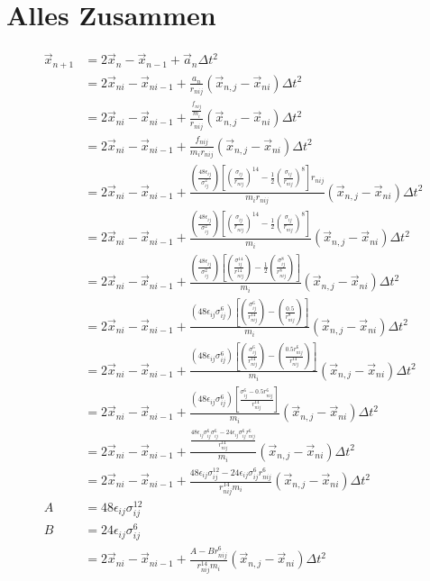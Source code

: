 \documentclass{article}
\begin{document}
\section*{Alles Zusammen}
\begin{align}
	\vec{x}_{n+1}&=2\vec{x}_n-\vec{x}_{n-1}+\vec{a}_n\Delta t^2\\
	&=2\vec{x}_{ni}-\vec{x}_{ni-1}+\frac{a_n}{r_{nij}}\left(\vec{x}_{n,j}-\vec{x}_{ni}\right)\Delta t^2\\
	&=2\vec{x}_{ni}-\vec{x}_{ni-1}+\frac{\frac{f_{nij}}{m_i}}{r_{nij}}\left(\vec{x}_{n,j}-\vec{x}_{ni}\right)\Delta t^2\\
	&=2\vec{x}_{ni}-\vec{x}_{ni-1}+\frac{f_{nij}}{m_ir_{nij}}\left(\vec{x}_{n,j}-\vec{x}_{ni}\right)\Delta t^2\\
	&=2\vec{x}_{ni}-\vec{x}_{ni-1}+\frac{\left(\frac{48\epsilon_{ij}}{\sigma_{ij}^2}\right)\left[\left(\frac{\sigma_{ij}}{r_{nij}}\right)^{14}-\frac{1}{2}\left(\frac{\sigma_{ij}}{r_{nij}}\right)^8\right]r_{nij}}{m_ir_{nij}}\left(\vec{x}_{n,j}-\vec{x}_{ni}\right)\Delta t^2\\
	&=2\vec{x}_{ni}-\vec{x}_{ni-1}+\frac{\left(\frac{48\epsilon_{ij}}{\sigma_{ij}^2}\right)\left[\left(\frac{\sigma_{ij}}{r_{nij}}\right)^{14}-\frac{1}{2}\left(\frac{\sigma_{ij}}{r_{nij}}\right)^8\right]}{m_i}\left(\vec{x}_{n,j}-\vec{x}_{ni}\right)\Delta t^2\\
	&=2\vec{x}_{ni}-\vec{x}_{ni-1}+\frac{\left(\frac{48\epsilon_{ij}}{\sigma_{ij}^2}\right)\left[\left(\frac{\sigma_{ij}^{14}}{r_{nij}^{14}}\right)-\frac{1}{2}\left(\frac{\sigma_{ij}^8}{r_{nij}^8}\right)\right]}{m_i}\left(\vec{x}_{n,j}-\vec{x}_{ni}\right)\Delta t^2\\
	&=2\vec{x}_{ni}-\vec{x}_{ni-1}+\frac{\left(48\epsilon_{ij}\sigma_{ij}^{6}\right)\left[\left(\frac{\sigma_{ij}^{6}}{r_{nij}^{14}}\right)-\left(\frac{0.5}{r_{nij}^8}\right)\right]}{m_i}\left(\vec{x}_{n,j}-\vec{x}_{ni}\right)\Delta t^2\\
	&=2\vec{x}_{ni}-\vec{x}_{ni-1}+\frac{\left(48\epsilon_{ij}\sigma_{ij}^{6}\right)\left[\left(\frac{\sigma_{ij}^{6}}{r_{nij}^{14}}\right)-\left(\frac{0.5r_{nij}^6}{r_{nij}^{14}}\right)\right]}{m_i}\left(\vec{x}_{n,j}-\vec{x}_{ni}\right)\Delta t^2\\
	&=2\vec{x}_{ni}-\vec{x}_{ni-1}+\frac{\left(48\epsilon_{ij}\sigma_{ij}^{6}\right)\left[\frac{\sigma_{ij}^{6}-0.5r_{nij}^6}{r_{nij}^{14}}\right]}{m_i}\left(\vec{x}_{n,j}-\vec{x}_{ni}\right)\Delta t^2\\
	&=2\vec{x}_{ni}-\vec{x}_{ni-1}+\frac{\frac{48\epsilon_{ij}\sigma_{ij}^{6}\sigma_{ij}^{6}-24\epsilon_{ij}\sigma_{ij}^{6}r_{nij}^6}{r_{nij}^{14}}}{m_i}\left(\vec{x}_{n,j}-\vec{x}_{ni}\right)\Delta t^2\\
	&=2\vec{x}_{ni}-\vec{x}_{ni-1}+\frac{48\epsilon_{ij}\sigma_{ij}^{12}-24\epsilon_{ij}\sigma_{ij}^{6}r_{nij}^6}{r_{nij}^{14}m_i}\left(\vec{x}_{n,j}-\vec{x}_{ni}\right)\Delta t^2\\
	A&=48\epsilon_{ij}\sigma_{ij}^{12}\\
	B&=24\epsilon_{ij}\sigma_{ij}^{6}\\
&=2\vec{x}_{ni}-\vec{x}_{ni-1}+\frac{A-Br_{nij}^6}{r_{nij}^{14}m_i}\left(\vec{x}_{n,j}-\vec{x}_{ni}\right)\Delta t^2\\
\end{align}
\end{document}
